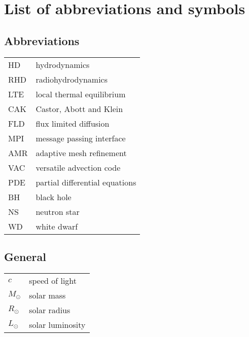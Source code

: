 \chapter*{List of abbreviations and symbols}
\begin{multicols}{2}
\section*{Abbreviations}
\begin{tabular}{ll}
HD     & hydrodynamics             \\
RHD    & radiohydrodynamics        \\
LTE    & local thermal equilibrium \\
CAK    & Castor, Abott and Klein   \\
FLD    & flux limited diffusion    \\
MPI    & message passing interface \\
AMR    & adaptive mesh refinement  \\
VAC    & versatile advection code  \\
PDE    & partial differential equations \\
BH     & black hole \\
NS     & neutron star \\
WD 	   & white dwarf \\
\end{tabular}

\section*{General}
\begin{tabular}{ll}
$c$               & speed of light \\
$M_\odot$         & solar mass  \\
$R_\odot$         & solar radius\\
$L_\odot$         & solar luminosity \\

\end{tabular}


\end{multicols}
